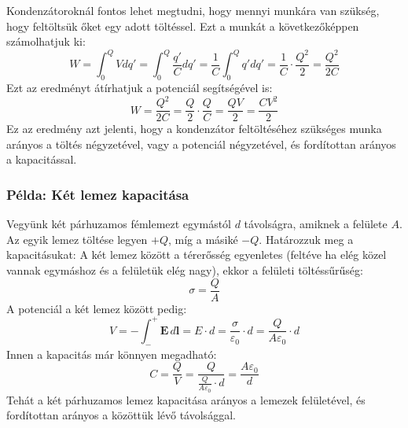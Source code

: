 \documentclass[../main.tex]{subfiles}
\begin{document}
Kondenzátoroknál fontos lehet megtudni, hogy mennyi munkára van szükség, hogy feltöltsük őket egy adott töltéssel. Ezt a munkát a következőképpen számolhatjuk ki:
\begin{equation}
    W = \int_{0}^{Q} V dq' = \int_{0}^{Q} \frac{q'}{C} dq' = \frac{1}{C} \int_{0}^{Q} q' dq' = \frac{1}{C} \cdot \frac{Q^2}{2} = \frac{Q^2}{2C}
\end{equation}
Ezt az eredményt átírhatjuk a potenciál segítségével is:
\begin{equation}
    W = \frac{Q^2}{2C} = \frac{Q}{2} \cdot \frac{Q}{C} = \frac{Q V}{2} = \frac{C V^2}{2}
\end{equation}
Ez az eredmény azt jelenti, hogy a kondenzátor feltöltéséhez szükséges munka arányos a töltés négyzetével, vagy a potenciál négyzetével, és fordítottan arányos a kapacitással.

\subsubsection*{Példa: Két lemez kapacitása}
Vegyünk két párhuzamos fémlemezt egymástól $d$ távolságra, amiknek a felülete $A$. Az egyik lemez töltése legyen $+Q$, míg a másiké $-Q$. Határozzuk meg a kapacitásukat:
A két lemez között a térerősség egyenletes (feltéve ha elég közel vannak egymáshoz és a felületük elég nagy), ekkor a felületi töltéssűrűség:
\begin{equation}
    \sigma = \frac{Q}{A}
\end{equation}
A potenciál a két lemez között pedig:
\begin{equation}
    V = - \int_{-}^{+} \mathbf{E} \, d\mathbf{l} = E \cdot d = \frac{\sigma}{\varepsilon_0} \cdot d = \frac{Q}{A \varepsilon_0} \cdot d
\end{equation}
Innen a kapacitás már könnyen megadható:
\begin{equation}
    C = \frac{Q}{V} = \frac{Q}{\frac{Q}{A \varepsilon_0} \cdot d} = \frac{A \varepsilon_0}{d}
\end{equation}
Tehát a két párhuzamos lemez kapacitása arányos a lemezek felületével, és fordítottan arányos a közöttük lévő távolsággal.
\end{document}
